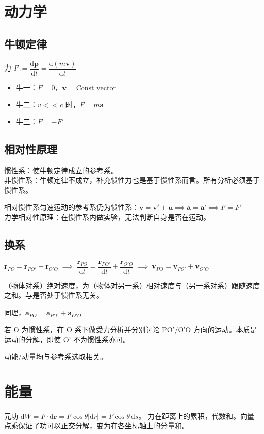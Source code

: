 \documentclass[12pt, a4paper, UTF8, openany]{ctexbook}
\newcommand{\dif}{\mathrm{d}}
\newcommand{\sdif}{\,\mathrm{d}}
\newcommand{\vect}[1]{\mathbf{#1}}
\newcommand{\vecr}{\vect{r}}
\newcommand{\vecv}{\vect{v}}
\newcommand{\veca}{\vect{a}}
\begin{document}
    \section{动力学}
        \subsection{牛顿定律}
        力 $F := \dfrac{\dif \vect{p}}{\dif t} = \dfrac{\dif (m\vecv)}{\dif t}$
        
        \begin{itemize}
            \item 牛一：$F = 0$，$\vecv = \text{Const vector}$
            \item 牛二：$v << c$ 时，$F = m\veca$
            \item 牛三：$F = -F'$
        \end{itemize}

        \subsection{相对性原理}
        惯性系：使牛顿定律成立的参考系。\\
        非惯性系：牛顿定律不成立，补充惯性力也是基于惯性系而言。所有分析必须基于惯性系。

        相对惯性系匀速运动的参考系仍为惯性系：$\vecv = \vecv' + \vect{u} \implies \veca = \veca' \implies F = F'$ \\
        力学相对性原理：在惯性系内做实验，无法判断自身是否在运动。

        \subsection{换系}
        $\vecr_{PO} = \vecr_{PO'} + \vecr_{O'O} \; \implies \; 
        \dfrac{\vecr_{PO}}{\dif t} = \dfrac{\vecr_{PO'}}{\dif t} + \dfrac{\vecr_{O'O}}{\dif t} \; \implies \;
        \vecv_{PO} = \vecv_{PO'} + \vecv_{O'O}$

        （物体对系）绝对速度，为（物体对另一系）相对速度与（另一系对系）跟随速度之和。与是否处于惯性系无关。

        同理，$\veca_{PO} = \veca_{PO'} + \veca_{O'O}$

        若 O 为惯性系，在 O 系下做受力分析并分别讨论 PO'/O'O 方向的运动。本质是运动的分解，即使 O' 不为惯性系亦可。

        {\heiti 动能/动量均与参考系选取相关}。

    \section{能量}
    元功 $\dif W = F \cdot \dif\vecr = F \cos\theta |\dif r| = F \cos\theta \sdif s$。
    力在距离上的累积，代数和。向量点乘保证了功可以正交分解，变为在各坐标轴上的分量和。
\end{document}
